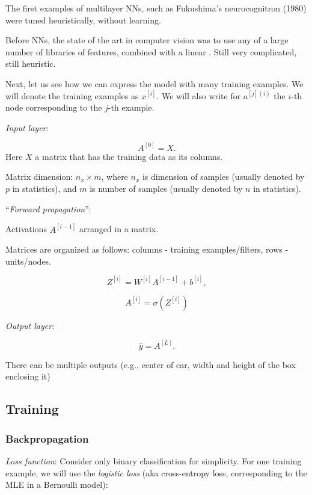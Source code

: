 \documentclass[english]{article}
\begin{document}
The first examples of multilayer NNs, such as Fukushima's neurocognitron (1980) were tuned heuristically, without learning.

Before NNs, the state of the art in computer vision was to use any of a large number of libraries of features, combined with a linear  . Still very complicated, still heuristic.

\item Next, let us see how we can express the model with many training  examples. We will denote the training examples as $x^{[i]}$. We will also write for $a^{[j](i)}$ the $i$-th node corresponding to the $j$-th example. 

\benum 
\item 
\emph{Input layer}:  

$$A^{[0]} = X.$$ 
Here $X$ a matrix that has the training data as its columns. 

Matrix dimension: $n_x \times m$, where $n_x$ is dimension of samples (usually denoted by $p$ in statistics), and $m$ is number of samples (usually denoted by $n$ in statistics).
\item 
``\emph{Forward propagation}'': 

Activations $A^{[i-1]}$ arranged in a matrix. 

Matrices are organized as follows: columns - training examples/filters,  rows - units/nodes. 


$$Z^{[i]} =  W^{[i]}A^{[i-1]}+b^{[i]},$$

$$A^{[i]}  = \sigma(Z^{[i]})$$
\item  
\emph{Output layer}:  

$$\hat y = A^{[L]}.$$

There can be multiple outputs (e.g., center of car, width and height of the box enclosing it)

\eenum

\eenum

\subsection{Training}
\subsubsection{Backpropagation}

\benum
\item \emph{Loss function}: Consider only binary classification for simplicity. For one training example, we will use the \emph{logistic loss} (aka cross-entropy loss, corresponding to the MLE in a Bernoulli model): 
\end{document}
